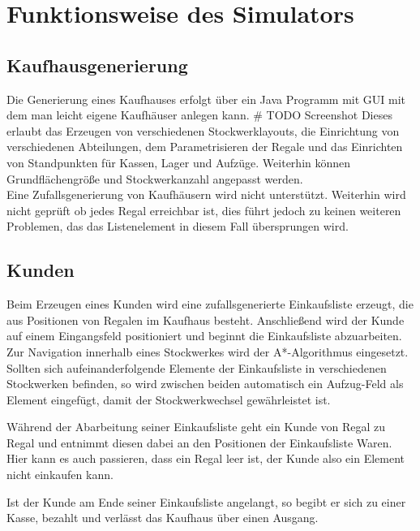 \section{Funktionsweise des Simulators}

\subsection{Kaufhausgenerierung}
Die Generierung eines Kaufhauses erfolgt über ein Java Programm mit GUI mit dem man leicht eigene Kaufhäuser anlegen kann. \# TODO Screenshot
Dieses erlaubt das Erzeugen von verschiedenen Stockwerklayouts, die Einrichtung von verschiedenen Abteilungen, dem Parametrisieren der Regale und das Einrichten von Standpunkten für Kassen, Lager und Aufzüge. Weiterhin können Grundflächengröße und Stockwerkanzahl angepasst werden.\\Eine Zufallsgenerierung von Kaufhäusern wird nicht unterstützt. Weiterhin wird nicht geprüft ob jedes Regal erreichbar ist, dies führt jedoch zu keinen weiteren Problemen, das das Listenelement in diesem Fall übersprungen wird.

\subsection{Kunden}
Beim Erzeugen eines Kunden wird eine zufallsgenerierte Einkaufsliste erzeugt, die aus Positionen von Regalen im Kaufhaus besteht. Anschließend wird der Kunde auf einem Eingangsfeld positioniert und beginnt die Einkaufsliste abzuarbeiten. Zur Navigation innerhalb eines Stockwerkes wird der A*-Algorithmus eingesetzt. Sollten sich aufeinanderfolgende Elemente der Einkaufsliste in verschiedenen Stockwerken befinden, so wird zwischen beiden automatisch ein Aufzug-Feld als Element eingefügt, damit der Stockwerkwechsel gewährleistet ist.

Während der Abarbeitung seiner Einkaufsliste geht ein Kunde von Regal zu Regal und entnimmt diesen dabei an den Positionen der Einkaufsliste Waren. Hier kann es auch passieren, dass ein Regal leer ist, der Kunde also ein Element nicht einkaufen kann.

Ist der Kunde am Ende seiner Einkaufsliste angelangt, so begibt er sich zu einer Kasse, bezahlt und verlässt das Kaufhaus über einen Ausgang.

